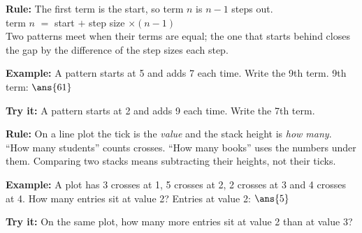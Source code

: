\documentclass[12pt]{article}
\begin{document}


\begin{formulabox}
\textbf{Rule:} The first term is the start, so term $n$ is $n - 1$ steps out.\\[3pt]
term $n$ $=$ start $+$ step size $\times (n - 1)$\\[3pt]
Two patterns meet when their terms are equal; the one that starts behind closes the gap by the difference of the step sizes each step.
\end{formulabox}

\begin{examplebox}
\textbf{Example:} \quad A pattern starts at 5 and adds 7 each time. Write the 9th term.
9th term: $\ans{61}$
\end{examplebox}

\begin{tryitbox}
\textbf{Try it:} \quad A pattern starts at 2 and adds 9 each time. Write the 7th term.\\[2pt]
\end{tryitbox}


\begin{formulabox}
\textbf{Rule:} On a line plot the tick is the \emph{value} and the stack height is \emph{how many}.\\[3pt]
``How many students'' counts crosses. ``How many books'' uses the numbers under them. Comparing two stacks means subtracting their heights, not their ticks.
\end{formulabox}

\begin{examplebox}
\textbf{Example:} \quad A plot has 3 crosses at 1, 5 crosses at 2, 2 crosses at 3 and 4 crosses at 4. How many entries sit at value 2?
Entries at value 2: $\ans{5}$
\end{examplebox}

\begin{tryitbox}
\textbf{Try it:} \quad On the same plot, how many more entries sit at value 2 than at value 3?\\[2pt]
\end{tryitbox}
\end{document}
